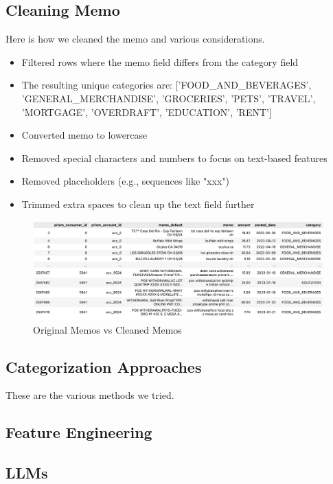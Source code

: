\documentclass[12pt,letterpaper]{article}
\begin{document}
\subsection{Cleaning Memo}
Here is how we cleaned the memo and various considerations.

\begin{itemize}
    \item Filtered rows where the memo field differs from the category field 
    \item The resulting unique categories are: ['FOOD\_AND\_BEVERAGES', 'GENERAL\_MERCHANDISE', 'GROCERIES', 'PETS', 'TRAVEL', 'MORTGAGE', 'OVERDRAFT', 'EDUCATION', 'RENT']
    \item Converted memo to lowercase
    \item Removed special characters and numbers to focus on text-based features
    \item Removed placeholders (e.g., sequences like "xxx")
    \item Trimmed extra spaces to clean up the text field further
\end{itemize}
\begin{figure}[H]
    \centering
    \includegraphics[width=1.0\textwidth]{pngs/memo_clean.png}
    \caption{Original Memos vs Cleaned Memos}
    \label{fig:enter-label}
\end{figure}

\subsection{Categorization Approaches}
These are the various methods we tried.

\subsection{Feature Engineering}

\subsection{LLMs}
\end{document}
